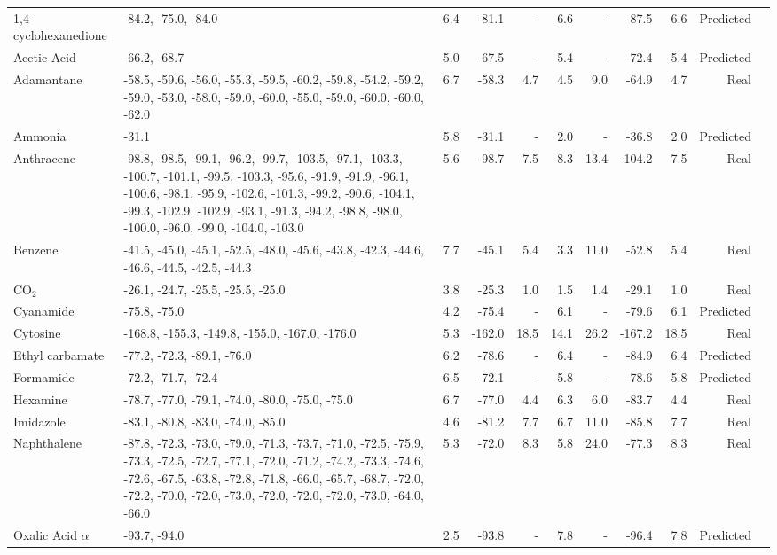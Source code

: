 \begin{longtable}{lp{35mm}rrrrrrrrr}
\midrule
1,4-cyclohexanedione & -84.2, -75.0, -84.0 & 6.4 & -81.1 & - & 6.6 & - & -87.5 & 6.6 & Predicted \\
Acetic Acid & -66.2, -68.7 & 5.0 & -67.5 & - & 5.4 & - & -72.4 & 5.4 & Predicted \\
Adamantane & -58.5, -59.6, -56.0, -55.3, -59.5, -60.2, -59.8, -54.2, -59.2, -59.0, -53.0, -58.0, -59.0, -60.0, -55.0, -59.0, -60.0, -60.0, -62.0 & 6.7 & -58.3 & 4.7 & 4.5 & 9.0 & -64.9 & 4.7 & Real \\
Ammonia & -31.1 & 5.8 & -31.1 & - & 2.0 & - & -36.8 & 2.0 & Predicted \\
Anthracene & -98.8, -98.5, -99.1, -96.2, -99.7, -103.5, -97.1, -103.3, -100.7, -101.1, -99.5, -103.3, -95.6, -91.9, -91.9, -96.1, -100.6, -98.1, -95.9, -102.6, -101.3, -99.2, -90.6, -104.1, -99.3, -102.9, -102.9, -93.1, -91.3, -94.2, -98.8, -98.0, -100.0, -96.0, -99.0, -104.0, -103.0 & 5.6 & -98.7 & 7.5 & 8.3 & 13.4 & -104.2 & 7.5 & Real \\
Benzene & -41.5, -45.0, -45.1, -52.5, -48.0, -45.6, -43.8, -42.3, -44.6, -46.6, -44.5, -42.5, -44.3 & 7.7 & -45.1 & 5.4 & 3.3 & 11.0 & -52.8 & 5.4 & Real \\
CO$_2$ & -26.1, -24.7, -25.5, -25.5, -25.0 & 3.8 & -25.3 & 1.0 & 1.5 & 1.4 & -29.1 & 1.0 & Real \\
Cyanamide & -75.8, -75.0 & 4.2 & -75.4 & - & 6.1 & - & -79.6 & 6.1 & Predicted \\
Cytosine & -168.8, -155.3, -149.8, -155.0, -167.0, -176.0 & 5.3 & -162.0 & 18.5 & 14.1 & 26.2 & -167.2 & 18.5 & Real \\
Ethyl carbamate & -77.2, -72.3, -89.1, -76.0 & 6.2 & -78.6 & - & 6.4 & - & -84.9 & 6.4 & Predicted \\
Formamide & -72.2, -71.7, -72.4 & 6.5 & -72.1 & - & 5.8 & - & -78.6 & 5.8 & Predicted \\
Hexamine & -78.7, -77.0, -79.1, -74.0, -80.0, -75.0, -75.0 & 6.7 & -77.0 & 4.4 & 6.3 & 6.0 & -83.7 & 4.4 & Real \\
Imidazole & -83.1, -80.8, -83.0, -74.0, -85.0 & 4.6 & -81.2 & 7.7 & 6.7 & 11.0 & -85.8 & 7.7 & Real \\
Naphthalene & -87.8, -72.3, -73.0, -79.0, -71.3, -73.7, -71.0, -72.5, -75.9, -73.3, -72.5, -72.7, -77.1, -72.0, -71.2, -74.2, -73.3, -74.6, -72.6, -67.5, -63.8, -72.8, -71.8, -66.0, -65.7, -68.7, -72.0, -72.2, -70.0, -72.0, -73.0, -72.0, -72.0, -72.0, -73.0, -64.0, -66.0 & 5.3 & -72.0 & 8.3 & 5.8 & 24.0 & -77.3 & 8.3 & Real \\
Oxalic Acid $\alpha$ & -93.7, -94.0 & 2.5 & -93.8 & - & 7.8 & - & -96.4 & 7.8 & Predicted \\

\end{longtable}
